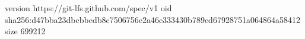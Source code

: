 version https://git-lfs.github.com/spec/v1
oid sha256:d47bba23dbcbbedb8c7506756e2a46c333430b789cd67928751a064864a58412
size 699212
